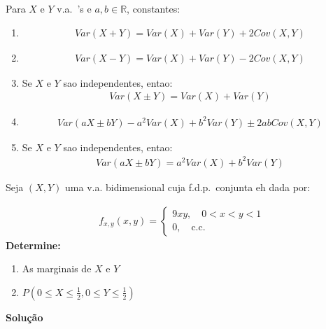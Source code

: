 \begin{description}
    Para $X$ e $Y$ v.a.\ 's e $a,b \in \mathbb{R}$, constantes:
    \begin{enumerate}
      \item 
       \begin{align*}
         Var(X+Y)= Var(X)+Var(Y) + 2 Cov(X,Y) 
       \end{align*} 
     \item 
       \begin{align*}
         Var(X-Y) = Var(X) + Var(Y) -2 Cov(X,Y)
       \end{align*}
     \item Se $X$ e $Y$ sao independentes, entao:
       \begin{align*}
         Var(X \pm Y) = Var(X) +Var(Y)
       \end{align*}
     \item 
       \begin{align*}
         Var(aX \pm bY) - a^2 Var(X)+ b^2 Var(Y) \pm 2ab Cov(X,Y)
       \end{align*}
     \item Se $X$ e $Y$ sao independentes, entao:
       \begin{align*}
         Var(aX \pm bY) = a^2 Var(X) + b^2Var(Y)
       \end{align*}
    \end{enumerate}
    \begin{example}Seja $(X,Y)$ uma v.a. bidimensional cuja f.d.p.\ conjunta eh dada por:

        \begin{align*}
          f_{x,y} (x,y) = \begin{cases}
            9xy, \quad 0<x<y<1  \\
            0, \quad \text{c.c.}
          \end{cases}
        \end{align*}
    \textbf{Determine:}
    \begin{enumerate}[label=(\alph*)]
      \item As marginais de $X$ e $Y$
      \item $P(0 \leq X \leq \frac{1}{2}, 0 \leq Y \leq \frac{1}{2})$
    \end{enumerate}
 \textbf{Solução}


\end{example}
\end{description}
